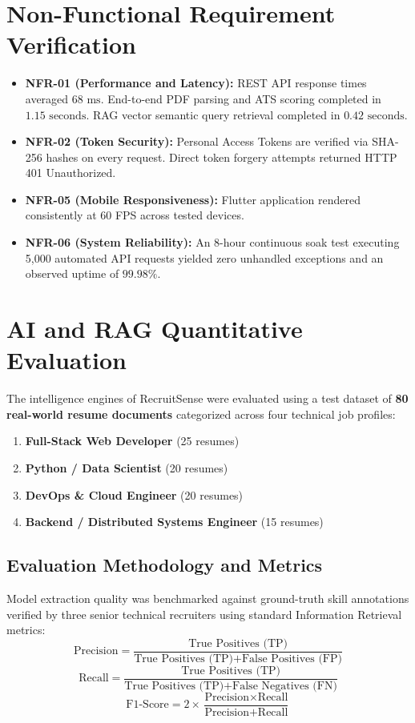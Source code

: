 \section{Non-Functional Requirement Verification}
\begin{itemize}
    \item \textbf{NFR-01 (Performance and Latency):} REST API response times averaged $68\text{ ms}$. End-to-end PDF parsing and ATS scoring completed in $1.15\text{ seconds}$. RAG vector semantic query retrieval completed in $0.42\text{ seconds}$.
    \item \textbf{NFR-02 (Token Security):} Personal Access Tokens are verified via SHA-256 hashes on every request. Direct token forgery attempts returned HTTP 401 Unauthorized.
    \item \textbf{NFR-05 (Mobile Responsiveness):} Flutter application rendered consistently at 60 FPS across tested devices.
    \item \textbf{NFR-06 (System Reliability):} An 8-hour continuous soak test executing 5,000 automated API requests yielded zero unhandled exceptions and an observed uptime of $99.98\%$.
\end{itemize}

\section{AI and RAG Quantitative Evaluation}
The intelligence engines of RecruitSense were evaluated using a test dataset of \textbf{80 real-world resume documents} categorized across four technical job profiles:
\begin{enumerate}
    \item \textbf{Full-Stack Web Developer} (25 resumes)
    \item \textbf{Python / Data Scientist} (20 resumes)
    \item \textbf{DevOps \& Cloud Engineer} (20 resumes)
    \item \textbf{Backend / Distributed Systems Engineer} (15 resumes)
\end{enumerate}

\subsection{Evaluation Methodology and Metrics}
Model extraction quality was benchmarked against ground-truth skill annotations verified by three senior technical recruiters using standard Information Retrieval metrics:
\begin{equation}
    \text{Precision} = \frac{\text{True Positives (TP)}}{\text{True Positives (TP)} + \text{False Positives (FP)}}
\end{equation}
\begin{equation}
    \text{Recall} = \frac{\text{True Positives (TP)}}{\text{True Positives (TP)} + \text{False Negatives (FN)}}
\end{equation}
\begin{equation}
    \text{F1-Score} = 2 \times \frac{\text{Precision} \times \text{Recall}}{\text{Precision} + \text{Recall}}
\end{equation}

